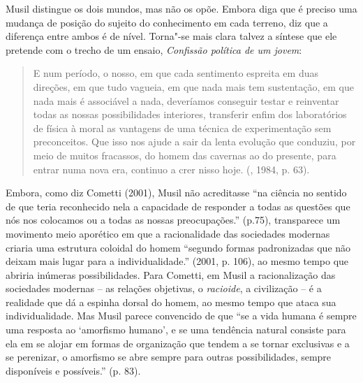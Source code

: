 Musil distingue os dois mundos, mas não os opõe. Embora diga que é
preciso uma mudança de posição do sujeito do conhecimento em cada
terreno, diz que a diferença entre ambos é de nível. Torna"-se mais clara
talvez a síntese que ele pretende com o trecho de um ensaio,
\emph{Confissão política de um jovem}:

\begin{quote}
E num período, o nosso, em que cada sentimento espreita em duas
direções, em que tudo vagueia, em que nada mais tem sustentação, em que
nada mais é associável a nada, deveríamos conseguir testar e reinventar
todas as nossas possibilidades interiores, transferir enfim dos
laboratórios de física à moral as vantagens de uma técnica de
experimentação sem preconceitos. Que isso nos ajude a sair da lenta
evolução que conduziu, por meio de muitos fracassos, do homem das
cavernas ao do presente, para entrar numa nova era, continuo a crer
nisso hoje. (, 1984, p. 63).
\end{quote}

Embora, como diz Cometti (2001), Musil não acreditasse ``na ciência no
sentido de que teria reconhecido nela a capacidade de responder a todas
as questões que nós nos colocamos ou a todas as nossas preocupações.''
(p.75), transparece um movimento meio aporético em que a racionalidade
das sociedades modernas criaria uma estrutura coloidal do homem
``segundo formas padronizadas que não deixam mais lugar para a
individualidade.'' (2001, p. 106), ao mesmo tempo que abriria inúmeras
possibilidades. Para Cometti, em Musil a racionalização das sociedades
modernas -- as relações objetivas, o \emph{racioide}, a civilização -- é
a realidade que dá a espinha dorsal do homem, ao mesmo tempo que ataca
sua individualidade. Mas Musil parece convencido de que ``se a vida
humana é sempre uma resposta ao `amorfismo humano', e se uma tendência
natural consiste para ela em se alojar em formas de organização que
tendem a se tornar exclusivas e a se perenizar, o amorfismo se abre
sempre para outras possibilidades, sempre disponíveis e possíveis.'' (p.
83).

